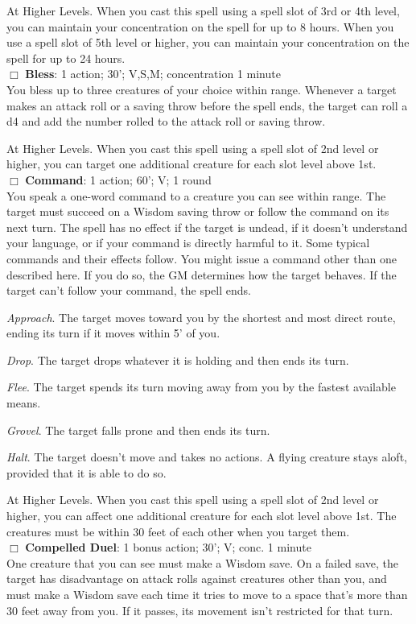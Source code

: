 \documentclass[11pt]{article}
\newcommand{\spell}[1]{{\sc\bfseries #1}}
\begin{document}
{At Higher Levels. When you cast this spell using a spell slot of 3rd
or 4th level, you can maintain your concentration on the spell for up
to 8 hours. When you use a spell slot of 5th level or higher, you can
maintain your concentration on the spell for up to 24 hours.
\\[4pt]
$\Box$ \spell{Bless}: 1 action; 30'; V,S,M; concentration 1 minute
\\
You bless up to three creatures of your choice within range. Whenever
a target makes an attack roll or a saving throw before the spell ends,
the target can roll a d4 and add the number rolled to the attack roll
or saving throw.

At Higher Levels. When you cast this spell using a spell slot of 2nd
level or higher, you can target one additional creature for each slot
level above 1st.
\\[4pt]
$\Box$ \spell{Command}: 1 action; 60'; V; 1 round
\\
You speak a one-word command to a creature you can see within
range. The target must succeed on a Wisdom saving throw or follow the
command on its next turn. The spell has no effect if the target is
undead, if it doesn’t understand your language, or if your command is
directly harmful to it.  Some typical commands and their effects
follow. You might issue a command other than one described here. If
you do so, the GM determines how the target behaves. If the target
can’t follow your command, the spell ends.

{\small
{\it Approach}. The target moves toward you by the shortest
  and most direct route, ending its turn if it moves within 5' of
  you.

{\it Drop}. The target drops whatever it is holding and then ends
  its turn.

{\it Flee}. The target spends its turn moving away from you by the
  fastest available means.

{\it Grovel}. The target falls prone and then ends its turn.

{\it Halt}. The target doesn’t move and takes no actions. A flying
  creature stays aloft, provided that it is able to do so.
}

\noindent
At Higher Levels. When you cast this spell using a spell slot of 2nd
level or higher, you can affect one additional creature for each slot
level above 1st. The creatures must be within 30 feet of each other
when you target them.
\\[4pt]
$\Box$ \spell{Compelled Duel}: 1 bonus action; 30'; V; conc. 1 minute
\\
One creature that you can see must make a Wisdom save. On a failed
save, the target has disadvantage on attack rolls against creatures
other than you, and must make a Wisdom save each time it tries to move
to a space that's more than 30 feet away from you. If it passes, its
movement isn't restricted for that turn.

}
\end{document}
